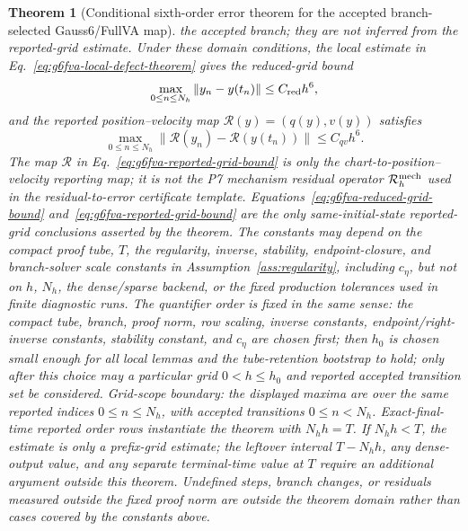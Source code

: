 \documentclass[preprint,12pt]{elsarticle}
\newtheorem{theorem}{Theorem}
\newcommand{\method}{Gauss6\slash FullVA}
\begin{document}
\begin{theorem}[Conditional sixth-order error theorem for the accepted branch-selected \method{} map]
the accepted branch; they are not inferred from the reported-grid estimate.  Under
these domain conditions, the local estimate in
Eq.~\eqref{eq:g6fva-local-defect-theorem} gives the reduced-grid bound
\begin{equation}
\label{eq:g6fva-reduced-grid-bound}
  \max_{0\le n\le N_h}\|y_n-y(t_n)\|\le C_{\rm red}h^6 ,
\end{equation}
and the reported position--velocity map
\(\mathcal R(y)=(q(y),v(y))\) satisfies
\begin{equation}
\label{eq:g6fva-reported-grid-bound}
  \max_{0\le n\le N_h}\|\mathcal R(y_n)-\mathcal R(y(t_n))\|
  \le C_{qv}h^6 .
\end{equation}
The map \(\mathcal R\) in Eq.~\eqref{eq:g6fva-reported-grid-bound} is only
the chart-to-position--velocity reporting map; it is not the P7 mechanism
residual operator \(\mathcal R_h^{\rm mech}\) used in the residual-to-error
certificate template.
Equations~\eqref{eq:g6fva-reduced-grid-bound}
and~\eqref{eq:g6fva-reported-grid-bound} are the only same-initial-state
reported-grid conclusions asserted by the theorem.
The constants may depend on the compact proof tube, \(T\), the regularity,
inverse, stability, endpoint-closure, and branch-solver scale constants in
Assumption~\ref{ass:regularity}, including \(c_\eta\), but not on \(h\),
\(N_h\), the dense/sparse backend, or the fixed production tolerances used in
finite diagnostic runs.
The quantifier order is fixed in the same sense: the compact tube, branch,
proof norm, row scaling, inverse constants, endpoint/right-inverse constants,
stability constant, and \(c_\eta\) are chosen first; then \(h_0\) is chosen
small enough for all local lemmas and the tube-retention bootstrap to hold;
only after this choice may a particular grid \(0<h\le h_0\) and reported
accepted transition set be considered.
Grid-scope boundary: the displayed maxima are over the same reported indices
\(0\le n\le N_h\), with accepted transitions \(0\le n<N_h\). Exact-final-time
reported order rows instantiate the theorem with \(N_hh=T\). If \(N_hh<T\),
the estimate is only a prefix-grid estimate; the leftover interval \(T-N_hh\),
any dense-output value, and any separate terminal-time value at \(T\) require
an additional argument outside this theorem. Undefined steps, branch changes,
or residuals measured outside the fixed proof norm are outside the theorem
domain rather than cases covered by the constants above.
\end{theorem}
\end{document}
